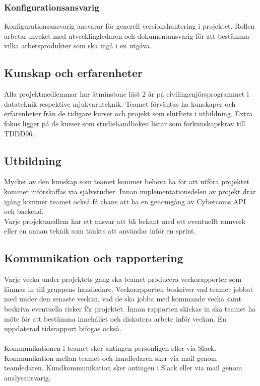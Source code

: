\subsubsection*{Konfigurationsansvarig}
Konfigurationsansvarig ansvarar för generell versionshantering i projektet. Rollen arbetar mycket med utvecklingledaren och dokumentansvarig för att bestämma vilka arbetsprodukter som ska ingå i en utgåva.



\subsection{Kunskap och erfarenheter}
Alla projektmedlemmar har åtminstone läst 2 år på civilingenjörsprogrammet i datateknik respektive mjukvaruteknik. Teamet förväntas ha kunskaper och erfarenheter från de tidigare kurser och projekt som slutförts i utbildning. Extra fokus ligger på de kurser som studiehandboken listar som förkunskapskrav till TDDD96\cite{bib-tddd96}.


\subsection{Utbildning}
Mycket av den kunskap som teamet kommer behöva ha för att utföra projektet kommer införskaffas via självstudier. Innan implementationsdelen av projekt drar igång kommer teamet också få chans att ha en genomgång av Cybercoms API och backend.
\\
Varje projektmedlem har ett ansvar att bli bekant med ett eventuellt ramverk eller en annan teknik som tänkts att användas inför en sprint.

\subsection{Kommunikation och rapportering}
Varje vecka under projektets gång ska teamet producera veckorapporter som lämnas in till gruppens handledare. Veckorapporten beskriver vad teamet jobbat med under den senaste veckan, vad de ska jobba med kommande vecka samt beskriva eventuella risker för projektet. Innan rapporten skickas in ska teamet ha möte för att bestämma innehållet och diskutera arbete inför veckan. En uppdaterad tidsrapport bifogas också.\\
\\
Kommunikationen i teamet sker antingen personligen eller via Slack. Kommunikation mellan teamet och handledaren sker via mail genom teamledaren. Kundkommunikation sker antingen i Slack eller via mail genom analysansvarig.

\pagebreak
